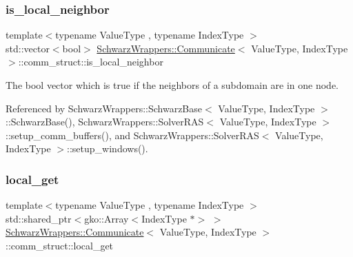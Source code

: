 \mbox{\label{structSchwarzWrappers_1_1Communicate_1_1comm__struct_a74f06e0065566a34f53343dbf6805705}} 
\subsubsection{\texorpdfstring{is\+\_\+local\+\_\+neighbor}{is\_local\_neighbor}}
{\footnotesize\ttfamily template$<$typename Value\+Type , typename Index\+Type $>$ \\
std\+::vector$<$bool$>$ \hyperlink{classSchwarzWrappers_1_1Communicate}{Schwarz\+Wrappers\+::\+Communicate}$<$ Value\+Type, Index\+Type $>$\+::comm\+\_\+struct\+::is\+\_\+local\+\_\+neighbor}



The bool vector which is true if the neighbors of a subdomain are in one node. 



Referenced by Schwarz\+Wrappers\+::\+Schwarz\+Base$<$ Value\+Type, Index\+Type $>$\+::\+Schwarz\+Base(), Schwarz\+Wrappers\+::\+Solver\+R\+A\+S$<$ Value\+Type, Index\+Type $>$\+::setup\+\_\+comm\+\_\+buffers(), and Schwarz\+Wrappers\+::\+Solver\+R\+A\+S$<$ Value\+Type, Index\+Type $>$\+::setup\+\_\+windows().

\mbox{\label{structSchwarzWrappers_1_1Communicate_1_1comm__struct_a6a639dca587e435f1843b87a849ff6a7}} 
\subsubsection{\texorpdfstring{local\+\_\+get}{local\_get}}
{\footnotesize\ttfamily template$<$typename Value\+Type , typename Index\+Type $>$ \\
std\+::shared\+\_\+ptr$<$gko\+::\+Array$<$Index\+Type $\ast$$>$ $>$ \hyperlink{classSchwarzWrappers_1_1Communicate}{Schwarz\+Wrappers\+::\+Communicate}$<$ Value\+Type, Index\+Type $>$\+::comm\+\_\+struct\+::local\+\_\+get}



